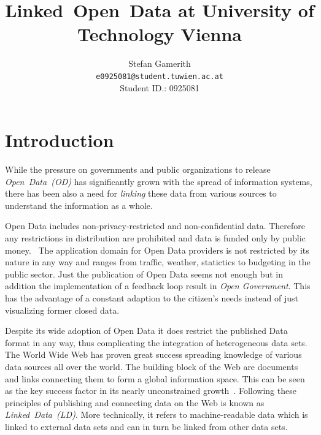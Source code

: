 \documentclass{article}
\begin{document}
\renewcommand{\bibname}{References}

\pagestyle{plain}
\setlength{\tabcolsep}{10pt}

\title{Linked~Open~Data at University of Technology Vienna}

\author{Stefan Gamerith\\
\texttt{e0925081@student.tuwien.ac.at} \\ Student ID.: 0925081}

\maketitle

\begin{abstract}
\end{abstract}

\tableofcontents

\newpage
{}

\section{Introduction}
While the pressure on governments and public organizations to release \textit{Open~Data~(OD)} has significantly grown with the spread of information systems, there has been also a need for \textit{linking} these data from various sources to understand the information as a whole.

Open Data includes non-privacy-restricted and non-confidential data. Therefore any restrictions in distribution are prohibited and data is funded only by public money.~\citet{article:janssen2012benefits} The application domain for Open Data providers is not restricted by its nature in any way and ranges from traffic, weather, statictics to budgeting in the public sector. Just the publication of Open Data seems not enough but in addition the implementation of a feedback loop result in \textit{Open Government}. This has the advantage of a constant adaption to the citizen's needs instead of just visualizing former closed data. 

Despite its wide adoption of Open Data it does restrict the published Data format in any way, thus complicating the integration of heterogeneous data sets. The World Wide Web has proven great success spreading knowledge of various data sources all over the world. The building block of the Web are documents and links connecting them to form a global information space. This can be seen as the key success factor in its nearly unconstrained growth~\cite{report:jacobs-i-2004--a}. 
Following these principles of publishing and connecting data on the Web is known as \textit{Linked~Data~(LD)}. More technically, it refers to machine-readable data which is linked to external data sets and can in turn be linked from other data sets. 
\end{document}
